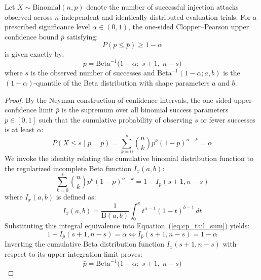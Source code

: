 \begin{theorem}
Let $X \sim \mathrm{Binomial}(n, p)$ denote the number of successful injection attacks observed across $n$ independent and identically distributed evaluation trials. For a prescribed significance level $\alpha \in (0, 1)$, the one-sided Clopper--Pearson upper confidence bound $\bar{p}$ satisfying:
\begin{equation}
    P(p \le \bar{p}) \ge 1 - \alpha
\end{equation}
is given exactly by:
\begin{equation}
    \bar{p} = \mathrm{Beta}^{-1}\big(1 - \alpha;\; s + 1,\; n - s\big)
\end{equation}
where $s$ is the observed number of successes and $\mathrm{Beta}^{-1}(1-\alpha; a, b)$ is the $(1-\alpha)$-quantile of the Beta distribution with shape parameters $a$ and $b$.
\end{theorem}

\begin{proof}
By the Neyman construction of confidence intervals, the one-sided upper confidence limit $\bar{p}$ is the supremum over all binomial success parameters $p \in [0, 1]$ such that the cumulative probability of observing $s$ or fewer successes is at least $\alpha$:
\begin{equation}
    \label{eq:cp_tail_sum}
    P(X \le s \mid p = \bar{p}) = \sum_{k=0}^s \binom{n}{k} \bar{p}^k (1 - \bar{p})^{n-k} = \alpha
\end{equation}
We invoke the identity relating the cumulative binomial distribution function to the regularized incomplete Beta function $I_x(a, b)$:
\begin{equation}
    \sum_{k=0}^s \binom{n}{k} p^k (1 - p)^{n-k} = 1 - I_p(s + 1, n - s)
\end{equation}
where $I_x(a, b)$ is defined as:
\begin{equation}
    I_x(a, b) = \frac{1}{\mathrm{B}(a, b)} \int_0^x t^{a-1} (1 - t)^{b-1} \, dt
\end{equation}
Substituting this integral equivalence into Equation~(\ref{eq:cp_tail_sum}) yields:
\begin{equation}
    1 - I_{\bar{p}}(s + 1, n - s) = \alpha \iff I_{\bar{p}}(s + 1, n - s) = 1 - \alpha
\end{equation}
Inverting the cumulative Beta distribution function $I_x(s+1, n-s)$ with respect to its upper integration limit proves:
\begin{equation}
    \bar{p} = \mathrm{Beta}^{-1}\big(1 - \alpha;\; s + 1,\; n - s\big)
\end{equation}
\end{proof}

